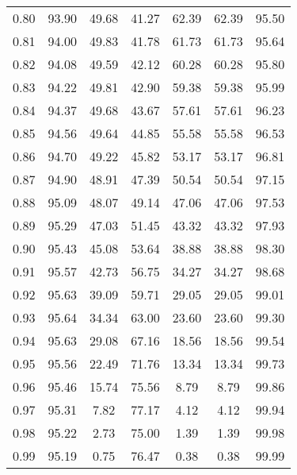 \begin{tabular}{|c|c|c|c|c|c|c|}
      0.80 &     93.90 &     49.68 &      41.27 &   62.39 &      62.39 &         95.50 \\
      0.81 &     94.00 &     49.83 &      41.78 &   61.73 &      61.73 &         95.64 \\
      0.82 &     94.08 &     49.59 &      42.12 &   60.28 &      60.28 &         95.80 \\
      0.83 &     94.22 &     49.81 &      42.90 &   59.38 &      59.38 &         95.99 \\
      0.84 &     94.37 &     49.68 &      43.67 &   57.61 &      57.61 &         96.23 \\
      0.85 &     94.56 &     49.64 &      44.85 &   55.58 &      55.58 &         96.53 \\
      0.86 &     94.70 &     49.22 &      45.82 &   53.17 &      53.17 &         96.81 \\
      0.87 &     94.90 &     48.91 &      47.39 &   50.54 &      50.54 &         97.15 \\
      0.88 &     95.09 &     48.07 &      49.14 &   47.06 &      47.06 &         97.53 \\
      0.89 &     95.29 &     47.03 &      51.45 &   43.32 &      43.32 &         97.93 \\
      0.90 &     95.43 &     45.08 &      53.64 &   38.88 &      38.88 &         98.30 \\
      0.91 &     95.57 &     42.73 &      56.75 &   34.27 &      34.27 &         98.68 \\
      0.92 &     95.63 &     39.09 &      59.71 &   29.05 &      29.05 &         99.01 \\
      0.93 &     95.64 &     34.34 &      63.00 &   23.60 &      23.60 &         99.30 \\
      0.94 &     95.63 &     29.08 &      67.16 &   18.56 &      18.56 &         99.54 \\
      0.95 &     95.56 &     22.49 &      71.76 &   13.34 &      13.34 &         99.73 \\
      0.96 &     95.46 &     15.74 &      75.56 &    8.79 &       8.79 &         99.86 \\
      0.97 &     95.31 &      7.82 &      77.17 &    4.12 &       4.12 &         99.94 \\
      0.98 &     95.22 &      2.73 &      75.00 &    1.39 &       1.39 &         99.98 \\
      0.99 &     95.19 &      0.75 &      76.47 &    0.38 &       0.38 &         99.99 \\
\bottomrule
\end{tabular}
